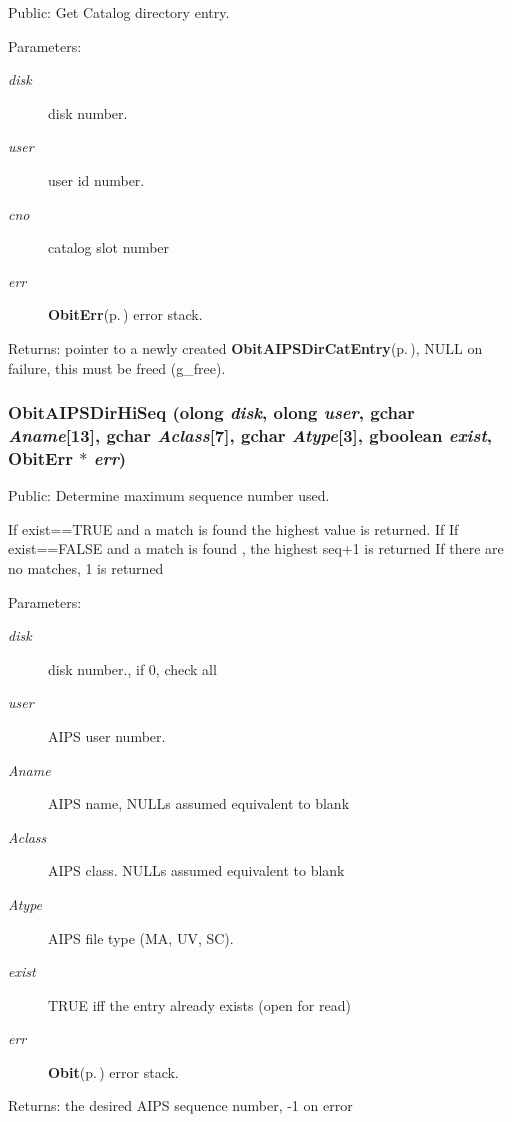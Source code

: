Public: Get Catalog directory entry. 

\begin{Desc}
\item[Parameters:]
\begin{description}
\item[{\em disk}]disk number. \item[{\em user}]user id number. \item[{\em cno}]catalog slot number \item[{\em err}]{\bf Obit\-Err}{\rm (p.\,\pageref{structObitErr})} error stack. \end{description}
\end{Desc}
\begin{Desc}
\item[Returns:]pointer to a newly created {\bf Obit\-AIPSDir\-Cat\-Entry}{\rm (p.\,\pageref{structObitAIPSDirCatEntry})}, NULL on failure, this must be freed (g\_\-free). \end{Desc}
\subsubsection{ Obit\-AIPSDir\-Hi\-Seq ({\bf olong} {\em disk}, {\bf olong} {\em user}, gchar {\em Aname}[13], gchar {\em Aclass}[7], gchar {\em Atype}[3], gboolean {\em exist}, {\bf Obit\-Err} $\ast$ {\em err})}\label{ObitAIPSDir_8h_a14}


Public: Determine maximum sequence number used. 

If exist==TRUE and a match is found the highest value is returned. If If exist==FALSE and a match is found , the highest seq+1 is returned If there are no matches, 1 is returned \begin{Desc}
\item[Parameters:]
\begin{description}
\item[{\em disk}]disk number., if 0, check all \item[{\em user}]AIPS user number. \item[{\em Aname}]AIPS name, NULLs assumed equivalent to blank \item[{\em Aclass}]AIPS class. NULLs assumed equivalent to blank \item[{\em Atype}]AIPS file type (MA, UV, SC). \item[{\em exist}]TRUE iff the entry already exists (open for read) \item[{\em err}]{\bf Obit}{\rm (p.\,\pageref{structObit})} error stack. \end{description}
\end{Desc}
\begin{Desc}
\item[Returns:]the desired AIPS sequence number, -1 on error \end{Desc}

